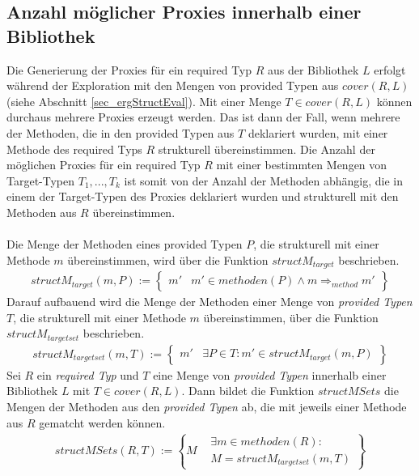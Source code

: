 \subsection{Anzahl möglicher Proxies innerhalb einer Bibliothek}\label{sec_anzahlProxies}
Die Generierung der Proxies für ein required Typ $R$ aus der Bibliothek $L$ erfolgt während der Exploration mit den Mengen von provided Typen aus $\mathit{cover(R,L)}$ (siehe Abschnitt \ref{sec_ergStructEval}). Mit einer Menge $T \in \mathit{cover(R,L)}$ können durchaus mehrere Proxies erzeugt werden. Das ist dann der Fall, wenn mehrere der Methoden, die in den provided Typen aus $T$ deklariert wurden, mit einer Methode des required Typs $R$ strukturell übereinstimmen.
Die Anzahl der möglichen Proxies für ein required Typ $R$ mit einer bestimmten Mengen von Target-Typen $T_1,...,T_k$ ist somit von der Anzahl der Methoden abhängig, die in einem der Target-Typen des Proxies deklariert wurden und strukturell mit den Methoden aus $R$ übereinstimmen. 
\\\\
Die Menge der Methoden eines provided Typen $P$, die strukturell mit einer Methode $m$ übereinstimmen, wird über die Funktion $\mathit{structM_{target}}$ beschrieben.
\begin{gather*}
\mathit{structM_{target}(m, P)} := 
\left\{\begin{array}{l|l}
m'	& m' \in \mathit{methoden(P)} \wedge  m \Rightarrow_{method} m'
\end{array}
\right\}
\end{gather*}
\noindent
Darauf aufbauend wird die Menge der Methoden einer Menge von \emph{provided Typen} $T$, die strukturell mit einer Methode $m$ übereinstimmen, über die Funktion $\mathit{structM_{targetset}}$ beschrieben.
\begin{gather*}
\mathit{structM_{targetset}(m, T)} := 
\left\{\begin{array}{l|l}
m'	& \exists P \in T: m' \in \mathit{structM_{target}(m,P)}
\end{array}
\right\}
\end{gather*}
\noindent
Sei $R$ ein \emph{required Typ} und $T$ eine Menge von \emph{provided Typen} innerhalb einer Bibliothek $L$ mit $T \in \mathit{cover(R,L)}$. Dann bildet die Funktion $\mathit{structMSets}$ die Mengen der Methoden aus den \emph{provided Typen} ab, die mit jeweils einer Methode aus $R$ gematcht werden können.
\begin{gather*}
\mathit{structMSets(R,T)} := 
\left\{M
\begin{array}{l|l}
&\exists \mathit{m} \in \mathit{methoden(R)} : 
\\
&M = \mathit{structM_{targetset}(m,T)}
\end{array}
\right\}
\end{gather*}
